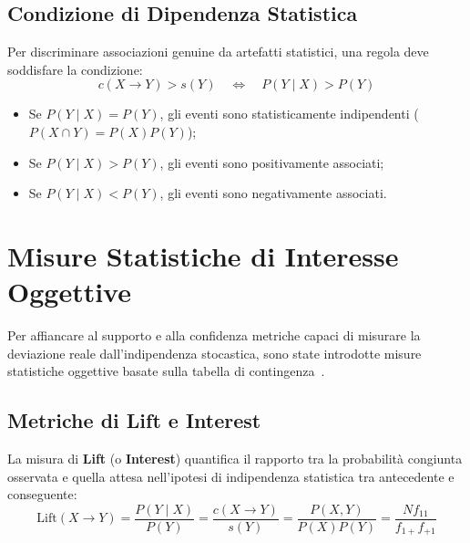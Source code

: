 \FloatBarrier
\subsection{Condizione di Dipendenza Statistica}
Per discriminare associazioni genuine da artefatti statistici, una regola deve soddisfare la condizione:
\begin{equation}
\label{eq:dm-statistical-dependence-condition}
c(X \longrightarrow Y) > s(Y) \quad \Longleftrightarrow \quad P(Y \mid X) > P(Y)
\end{equation}
\begin{itemize}[noitemsep]
    \item Se $P(Y \mid X) = P(Y)$, gli eventi sono statisticamente indipendenti ($P(X \cap Y) = P(X)P(Y)$);
    \item Se $P(Y \mid X) > P(Y)$, gli eventi sono positivamente associati;
    \item Se $P(Y \mid X) < P(Y)$, gli eventi sono negativamente associati.
\end{itemize}

\FloatBarrier
\section{Misure Statistiche di Interesse Oggettive}
\label{sec:dm-interest-measures}

Per affiancare al supporto e alla confidenza metriche capaci di misurare la deviazione reale dall'indipendenza stocastica, sono state introdotte misure statistiche oggettive basate sulla tabella di contingenza~\cite{tan2018, piatetsky1991}.

\FloatBarrier
\subsection{Metriche di Lift e Interest}
La misura di \textbf{Lift} (o \textbf{Interest}) quantifica il rapporto tra la probabilità congiunta osservata e quella attesa nell'ipotesi di indipendenza statistica tra antecedente e conseguente:
\begin{equation}
\label{eq:dm-lift-definition}
\mathrm{Lift}(X \longrightarrow Y) = \frac{P(Y \mid X)}{P(Y)} = \frac{c(X \longrightarrow Y)}{s(Y)} = \frac{P(X, Y)}{P(X)P(Y)} = \frac{N f_{11}}{f_{1+} f_{+1}}
\end{equation}

